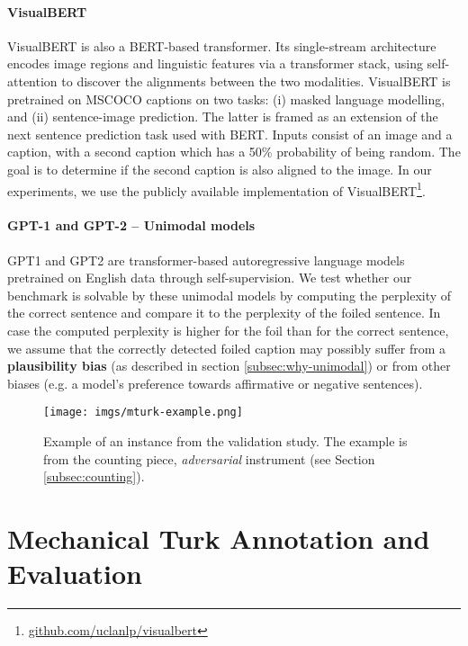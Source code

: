 \documentclass[11pt]{article}
\begin{document}
\paragraph{VisualBERT} VisualBERT \cite{li2019visualbert} is also a BERT-based transformer. Its single-stream architecture encodes image regions and linguistic features via a transformer stack, using self-attention to discover the alignments between the two modalities. VisualBERT is pretrained on MSCOCO captions \cite{Chen2015} on two tasks: (i) masked language modelling, and (ii) sentence-image prediction. The latter is framed as an extension of the next sentence prediction task used with BERT. Inputs consist of an image and a caption, with a second caption which has a 50\% probability of being random. The goal is to determine if the second caption is also aligned to the image.
In our experiments, we use the publicly available implementation of VisualBERT\footnote{\url{github.com/uclanlp/visualbert}}.


\paragraph{GPT-1 and GPT-2 -- Unimodal models}
GPT1 \cite{radford2018improving} and GPT2 \cite{radford2019language} are transformer-based autoregressive language models pretrained on English data through self-supervision. We test whether our benchmark is solvable by these unimodal models by computing the perplexity of the correct sentence and compare it to the perplexity of the foiled sentence. In case the computed perplexity is higher for the foil than for the correct sentence,
we assume that the correctly detected foiled caption may possibly suffer
from a \textbf{plausibility bias} (as described in section \ref{subsec:why-unimodal}) or from other biases (e.g. a model's preference towards affirmative or negative sentences).

\begin{figure*}[t]
    \centering
    \texttt{[image: imgs/mturk-example.png]}
    \caption{Example of an instance from the validation study. The example is from the counting piece, {\em adversarial} instrument (see Section \ref{subsec:counting}).}
    \label{fig:mturk-example}
\end{figure*}

\section{Mechanical Turk Annotation and Evaluation}\label{app:mturk}
\end{document}
